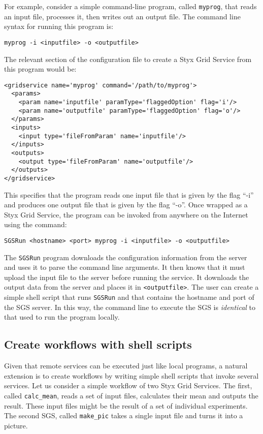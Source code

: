 \documentclass{llncs}
\begin{document}
For example, consider a simple command-line program, called {\tt myprog}, that reads an input file, processes it, then writes out an output file.  The command line syntax for running this program is:

\begin{verbatim}
myprog -i <inputfile> -o <outputfile>
\end{verbatim}

The relevant section of the configuration file to create a Styx Grid Service from this program would be:

\begin{verbatim}
<gridservice name='myprog' command='/path/to/myprog'>
  <params>
    <param name='inputfile' paramType='flaggedOption' flag='i'/>
    <param name='outputfile' paramType='flaggedOption' flag='o'/>
  </params>
  <inputs>
    <input type='fileFromParam' name='inputfile'/>
  </inputs>
  <outputs>
    <output type='fileFromParam' name='outputfile'/>
  </outputs>
</gridservice>
\end{verbatim}

This specifies that the program reads one input file that is given by the flag ``-i'' and produces one output file that is given by the flag ``-o''.  Once wrapped as a Styx Grid Service, the program can be invoked from anywhere on the Internet using the command:

\begin{verbatim}
SGSRun <hostname> <port> myprog -i <inputfile> -o <outputfile>
\end{verbatim}

The {\tt SGSRun} program downloads the configuration information from the server and uses it to parse the command line arguments.  It then knows that it must upload the input file to the server before running the service.  It downloads the output data from the server and places it in {\tt <outputfile>}.  The user can create a simple shell script that runs {\tt SGSRun} and that contains the hostname and port of the SGS server.  In this way, the command line to execute the SGS is {\em identical\/} to that used to run the program locally.

\subsection{Create workflows with shell scripts}
Given that remote services can be executed just like local programs, a natural extension is to create workflows by writing simple shell scripts that invoke several services.  Let us consider a simple workflow of two Styx Grid Services.  The first, called {\tt calc\_mean}, reads a set of input files, calculates their mean and outputs the result.  These input files might be the result of a set of individual experiments.  The second SGS, called {\tt make\_pic} takes a single input file and turns it into a picture.
\end{document}
